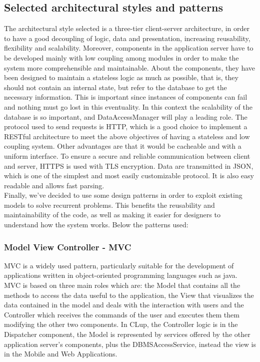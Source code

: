 \subsection{Selected architectural styles and patterns}
The architectural style selected is a three-tier client-server architecture, in order to have a good decoupling of logic, data and presentation, increasing reusability, flexibility and scalability. Moreover, components in the application server have to be developed mainly with low coupling among modules in order to make the system more comprehensible and maintainable. About the components, they have been designed to maintain a stateless logic as much as possible, that is, they should not contain an internal state, but refer to the database to get the necessary information. This is important since instances of components can fail and nothing must go lost in this eventuality. In this context the scalability of the database is so important, and DataAccessManager will play a leading role. 
The protocol used to send requests is HTTP, which is a good choice to implement a RESTful architecture to meet the above objectives of having a stateless and low coupling system. Other advantages are that it would be cacheable and with a uniform interface.
To ensure a secure and reliable communication between client and server, HTTPS is used with TLS encryption.
Data are transmitted in JSON, which is one of the simplest and most easily customizable protocol. It is also easy readable and allows fast parsing.\\
Finally, we've decided to use some design patterns in order to exploit existing models to solve recurrent problems. This benefits the reusability and maintainability of the code, as well as making it easier for designers to understand how the system works. Below the patterns used: \\
\subsubsection{Model View Controller - MVC}
MVC is a widely used pattern, particularly suitable for the development of applications written in object-oriented programming languages such as java. MVC is based on three main roles which are: the Model that contains all the methods to access the data useful to the application, the View that visualizes the data contained in the model and deals with the interaction with users and the Controller which receives the commands of the user and executes them them modifying the other two components. In CLup, the Controller logic is in the Dispatcher component, the Model is represented by services offered by the other application server's components, plus the DBMSAccessService, instead the view is in the Mobile and Web Applications.\\
